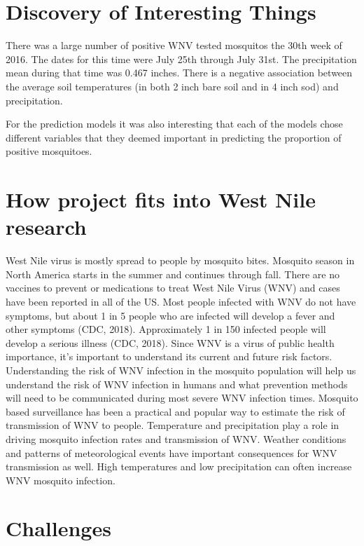 \documentclass[]{article}
\begin{document}
\hypertarget{discovery-of-interesting-things}{%
\section{Discovery of Interesting
Things}\label{discovery-of-interesting-things}}

There was a large number of positive WNV tested mosquitos the 30th week
of 2016. The dates for this time were July 25th through July 31st. The
precipitation mean during that time was 0.467 inches. There is a
negative association between the average soil temperatures (in both 2
inch bare soil and in 4 inch sod) and precipitation.

For the prediction models it was also interesting that each of the
models chose different variables that they deemed important in
predicting the proportion of positive mosquitoes.

\hypertarget{how-project-fits-into-west-nile-research}{%
\section{How project fits into West Nile
research}\label{how-project-fits-into-west-nile-research}}

West Nile virus is mostly spread to people by mosquito bites. Mosquito
season in North America starts in the summer and continues through fall.
There are no vaccines to prevent or medications to treat West Nile Virus
(WNV) and cases have been reported in all of the US. Most people
infected with WNV do not have symptoms, but about 1 in 5 people who are
infected will develop a fever and other symptoms (CDC, 2018).
Approximately 1 in 150 infected people will develop a serious illness
(CDC, 2018). Since WNV is a virus of public health importance, it's
important to understand its current and future risk factors.
Understanding the risk of WNV infection in the mosquito population will
help us understand the risk of WNV infection in humans and what
prevention methods will need to be communicated during most severe WNV
infection times. Mosquito based surveillance has been a practical and
popular way to estimate the risk of transmission of WNV to people.
Temperature and precipitation play a role in driving mosquito infection
rates and transmission of WNV. Weather conditions and patterns of
meteorological events have important consequences for WNV transmission
as well. High temperatures and low precipitation can often increase WNV
mosquito infection.

\hypertarget{challenges}{%
\section{Challenges}\label{challenges}}
\end{document}
